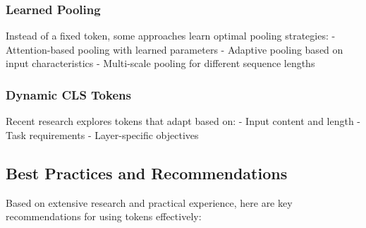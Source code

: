 \subsubsection{Learned Pooling}
Instead of a fixed \cls{} token, some approaches learn optimal pooling strategies:
- Attention-based pooling with learned parameters
- Adaptive pooling based on input characteristics
- Multi-scale pooling for different sequence lengths

\subsubsection{Dynamic CLS Tokens}
Recent research explores \cls{} tokens that adapt based on:
- Input content and length
- Task requirements
- Layer-specific objectives

\subsection{Best Practices and Recommendations}

Based on extensive research and practical experience, here are key recommendations for using \cls{} tokens effectively:

